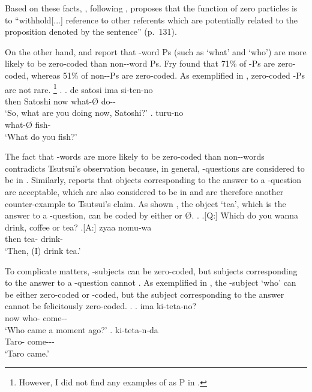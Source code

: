 Based on these facts,
, following ,
proposes that the function of zero particles is to
``withhold[...] reference to other referents 
which are potentially related to the proposition denoted by the sentence'' (p.~131).


On the other hand,
 and  report that
-word Ps (such as  `what' and  `who') are
more likely to be zero-coded than non--word Ps.
Fry found that 71\% of -Ps are zero-coded,
whereas 51\% of non--Ps are zero-coded.
As exemplified in \Next,
zero-coded -Ps are not rare.%
 \footnote{
 However, I did not find any examples of  as P in
 .
 }
%
\ex.
 \ag. de satosi ima  si-ten-no \\
      then Satoshi now what-{\O} do-- \\
      `So, what are you doing now, Satoshi?'
 \bg.  turu-no \\
      what-{\O} fish- \\
      `What do you fish?'

The fact that -words are more likely to be zero-coded than non--words contradicts Tsutsui's observation because,
in general, -questions are considered to be in .
Similarly,  reports that
objects corresponding to the answer to a -question are acceptable,
which are also considered to be in  and are therefore another counter-example to Tsutsui's claim.
As shown \Next[A],
the object  `tea', which is the answer to a -question, can be coded by either  or {\O}.
%
\ex.
 \a.[Q:] Which do you wanna drink, coffee or tea?
 \bg.[A:] zyaa  nomu-wa \\
          then tea- drink- \\
          `Then, (I) drink tea.'
          \hfill{\cite[291]{niwa06}}

To complicate matters,
-subjects can be zero-coded,
but subjects corresponding to the answer to a -question cannot \cite{niwa06}.
As exemplified in \Next,
the -subject  `who' can be either zero-coded or -coded,
but the subject corresponding to the answer cannot be felicitously zero-coded.
%
\ex.
 \ag. ima  ki-teta-no? \\
       now who- come-- \\
       `Who came a moment ago?'
 \bg.  ki-teta-n-da \\
       Taro- come--- \\
       `Taro came.'
          \hfill{\cite[291]{niwa06}}

